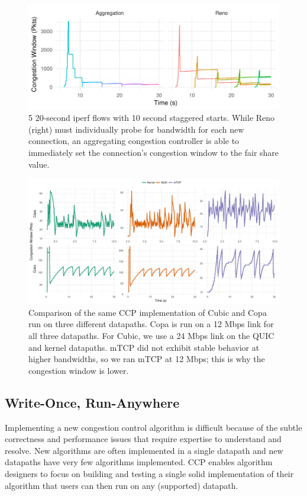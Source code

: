  \begin{figure}
    \centering
    \includegraphics[width=\columnwidth]{img/stair}
    \caption{5 20-second iperf flows with 10 second staggered starts. While Reno (right) must individually probe for bandwidth for each new connection, an aggregating congestion controller is able to immediately set the connection's congestion window to the fair share value.}
    \label{fig:cap:agg}
\end{figure}
\begin{figure}[t!]
    \centering
    \includegraphics[width=2\columnwidth]{img/new-wora}
    \caption{Comparison of the same CCP implementation of Cubic and Copa run on three different datapaths. Copa is run on a 12 Mbps link for all three datapaths. For Cubic, we use a 24 Mbps link on the QUIC and kernel datapaths. mTCP did not exhibit stable behavior at higher bandwidths, so we ran mTCP at 12 Mbps; this is why the congestion window is lower.}\label{fig:datapaths:wora}
\end{figure}


\subsection{Write-Once, Run-Anywhere}
\label{s:capabilities:wora}
\label{s:datapaths:eval}

Implementing a new congestion control algorithm is difficult because of the subtle correctness and performance issues that require expertise to understand and resolve. New algorithms are often implemented in a single datapath and new datapaths have very few algorithms implemented. 
CCP enables algorithm designers to focus on building and testing a single solid implementation of their algorithm that users can then run on any (supported) datapath. 

